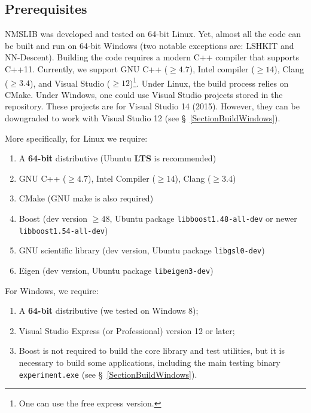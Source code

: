 \documentclass[runningheads,a4paper]{llncs}
\newcommand{\ttt}[1]{\texttt{#1}}
\begin{document}
{\subsection{Prerequisites}
NMSLIB was developed and tested on 64-bit Linux.
Yet, almost all the code can be built and run on 64-bit Windows (two notable exceptions are: LSHKIT and NN-Descent).
Building the code requires a modern C++ compiler that supports \mbox{C++11}.
Currently, we support GNU C++ ($\ge4.7$), Intel compiler ($\ge14$), 
Clang ($\ge3.4$), 
and Visual Studio ($\ge12$)\footnote{One can use the free express version.}.
Under Linux, the build process relies on CMake. 
Under Windows, one could use Visual Studio projects stored in the repository.
These projects are for Visual Studio 14 (2015). 
However, they can be downgraded to work with Visual Studio 12 (see \S~\ref{SectionBuildWindows}).


More specifically, for Linux we require:
\begin{enumerate}
\item A \textbf{64-bit} distributive (Ubuntu \textbf{LTS} is recommended)
\item GNU C++ ($\ge4.7$), Intel Compiler ($\ge14$), Clang ($\ge3.4$)
\item CMake (GNU make is also required)
\item Boost (dev version $\ge48$, Ubuntu package \ttt{libboost1.48-all-dev} or newer \ttt{libboost1.54-all-dev})
\item GNU scientific library (dev version, Ubuntu package \ttt{libgsl0-dev})
\item Eigen (dev version, Ubuntu package \ttt{libeigen3-dev})
\end{enumerate}

For Windows, we require:
\begin{enumerate}
\item A \textbf{64-bit} distributive (we tested on Windows 8); 
\item Visual Studio Express (or Professional) version 12 or later;
\item Boost is not required to build the core library and test utilities, 
but it is necessary to build some applications,
including the main testing binary \ttt{experiment.exe} (see \S~\ref{SectionBuildWindows}). 
\end{enumerate}

}
\end{document}
